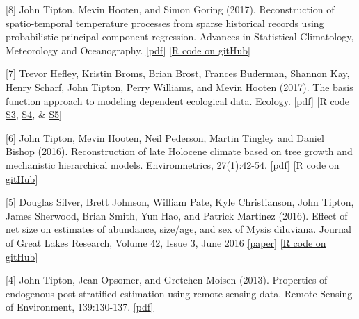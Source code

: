 \documentclass[11pt,]{article}
\renewenvironment{itemize}{
  \begin{list}{}{
    \setlength{\leftmargin}{1.5em}
  }
}{
  \end{list}
}
\begin{document}
\begin{itemize}
\item
  {[}8{]} John Tipton, Mevin Hooten, and Simon Goring (2017).
  Reconstruction of spatio-temporal temperature processes from sparse
  historical records using probabilistic principal component regression.
  Advances in Statistical Climatology, Meteorology and Oceanography.
  \href{http://www.adv-stat-clim-meteorol-oceanogr.net/3/1/2017/ascmo-3-1-2017.pdf}{{[}pdf{]}}
  \href{https://github.com/jtipton25/observer}{{[}R code on gitHub{]}}
\item
  {[}7{]} Trevor Hefley, Kristin Broms, Brian Brost, Frances Buderman,
  Shannon Kay, Henry Scharf, John Tipton, Perry Williams, and Mevin
  Hooten (2017). The basis function approach to modeling dependent
  ecological data. Ecology.
  \href{http://www.stat.colostate.edu/~hooten/papers/pdf/Hefley_etal_Ecology_2017.pdf}{{[}pdf{]}}
  {[}R code
  \href{http://onlinelibrary.wiley.com/store/10.1002/ecy.1674/asset/supinfo/ecy1674-sup-0003-AppendixS3.pdf?v=1\&s=1ec1d5c25a2287b36029dd315184190d0c5f8c04}{S3},
  \href{http://onlinelibrary.wiley.com/store/10.1002/ecy.1674/asset/supinfo/ecy1674-sup-0004-AppendixS4.pdf?v=1\&s=4c29dbe01f5521638315a3159c43971b30822d0c}{S4},
  \&
  \href{http://onlinelibrary.wiley.com/store/10.1002/ecy.1674/asset/supinfo/ecy1674-sup-0005-AppendixS5.pdf?v=1\&s=8bbe6b6f8165283cf91df19b528a34b8ee1ee6d4}{S5}{]}
\item
  {[}6{]} John Tipton, Mevin Hooten, Neil Pederson, Martin Tingley and
  Daniel Bishop (2016). Reconstruction of late Holocene climate based on
  tree growth and mechanistic hierarchical models. Environmetrics,
  27(1):42-54.
  \href{http://onlinelibrary.wiley.com/doi/10.1002/env.2368/abstract}{{[}pdf{]}}
  \href{https://github.com/jtipton25/Mechanistic-Tree-Ring}{{[}R code on
  gitHub{]}}
\item
  {[}5{]} Douglas Silver, Brett Johnson, William Pate, Kyle
  Christianson, John Tipton, James Sherwood, Brian Smith, Yun Hao, and
  Patrick Martinez (2016). Effect of net size on estimates of abundance,
  size/age, and sex of Mysis diluviana. Journal of Great Lakes Research,
  Volume 42, Issue 3, June 2016
  \href{http://www.sciencedirect.com/science/article/pii/S038013301600040X?via\%3Dihub}{{[}paper{]}}
  \href{http://jtipton25.github.io/mysis/}{{[}R code on gitHub{]}}
\item
  {[}4{]} John Tipton, Jean Opsomer, and Gretchen Moisen (2013).
  Properties of endogenous post-stratified estimation using remote
  sensing data. Remote Sensing of Environment, 139:130-137.
  \href{https://www.fs.fed.us/rm/pubs_other/rmrs_2013_tipton_j001.pdf}{{[}pdf{]}}

\end{itemize}
\end{document}

